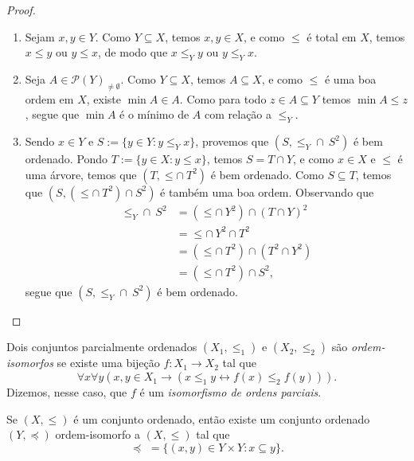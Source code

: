 \begin{proof}
    \leavevmode
        \begin{enumerate}[leftmargin=*, align=left, label=\textbf{(\alph*)}]
            \item Sejam $x, y \in Y$. Como $Y \subseteq X$, temos $x, y \in X$, e como $\leq$ é total em $X$, temos $x \leq y$ ou $y \leq x$, de modo que $x \leq_Y y$ ou $y \leq_Y x$. \blackproof
            \item Seja $A \in \mathcal{P}(Y)_{\neq \emptyset}$. Como $Y \subseteq X$, temos $A \subseteq X$, e como $\leq$ é uma boa ordem em $X$, existe $\min{A} \in A$. Como para todo $z \in A \subseteq Y$ temos $\min{A} \leq z$, segue que $\min{A}$ é o mínimo de $A$ com relação a $\leq_Y$. \blackproof
            \item Sendo $x \in Y$ e $S := \{y \in Y : y \leq_Y x \}$, provemos que $(S, \leq_Y \cap \ S^2)$ é bem ordenado. Pondo $T := \{y \in X : y \leq x \}$, temos $S = T \cap Y$, e como $x \in X$ e $\leq$ é uma árvore, temos que $(T, \leq \cap \ T^2)$ é bem ordenado. Como $S \subseteq T$, temos que $(S, (\leq \cap \ T^2) \cap S^2 )$ é também uma boa ordem. Observando que
                \begin{align*}
                    \leq_Y \cap \ S^2 &= (\leq \cap \ Y^2) \cap (T \cap Y)^2 \\
                    &= \leq \cap \ Y^2 \cap T^2 \\
                    &= (\leq \cap \ T^2) \cap (T^2 \cap Y^2) \\
                    &= (\leq \cap \ T^2) \cap S^2, 
                \end{align*}
            segue que $(S, \leq_Y \cap \ S^2)$ é bem ordenado. \blackproof
        \end{enumerate}
\end{proof}

\begin{definition}
    Dois conjuntos parcialmente ordenados $(X_1, \leq_1)$ e $(X_2, \leq_2)$ são \emph{ordem-isomorfos} se existe uma bijeção $f:X_1 \to X_2$ tal que 
        \[
          \forall x \forall y (x,y \in X_1 \rightarrow (x \leq_1 y \leftrightarrow f(x) \leq_2 f(y))).  
        \]
    Dizemos, nesse caso, que $f$ é um \emph{isomorfismo de ordens parciais}.
\end{definition}

\begin{theorem}
    Se $(X, \leq)$ é um conjunto ordenado, então existe um conjunto ordenado $(Y, \preceq)$ ordem-isomorfo a $(X,\leq)$ tal que 
        \[
            \preceq \, \, = \{ (x,y) \in Y \times Y : x \subseteq y \}.
        \]
\end{theorem}

